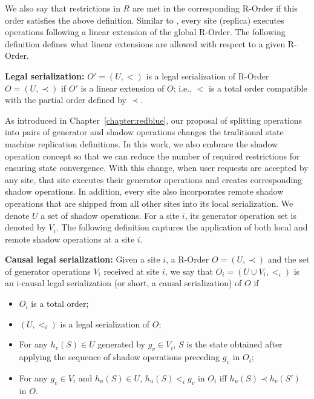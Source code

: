 We also say that restrictions in $R$ are met in the corresponding R-Order if this order
satisfies the above definition. Similar to \RBCN, every site (replica) executes operations following a linear
extension of the global R-Order. The following definition defines what linear extensions are allowed with respect to
a given R-Order.

\begin{mydef}
\textbf{Legal serialization: } $O' = (U, <)$ is a legal serialization of R-Order $O = (U, \prec)$
if $O'$ is a linear extension of $O$; i.e., $<$ is a total order compatible with the partial order defined by $\prec$.
\label{def:legalserial}
\end{mydef}

As introduced in Chapter~\ref{chapter:redblue}, our proposal of splitting operations into pairs of generator and shadow
operations changes the traditional state machine replication definitions. In this work, we also embrace
the shadow operation concept so that we can reduce the number of required restrictions for ensuring
state convergence. With this change,
when user requests are accepted by any site, that site executes their generator operations and 
creates corresponding shadow operations. In addition, every site also 
incorporates remote shadow operations that are shipped from all other sites into its local serialization. 
We denote $U$ a set of shadow operations. For a site $i$,
its generator operation set is denoted by $V_{i}$. The following definition captures the application
of both local and remote shadow operations at a site $i$.


\begin{mydef}
\textbf{Causal legal serialization: } Given a site $i$, a R-Order $O=(U, \prec)$ and the set of generator operations $V_i$ received at site $i$, we say that $O_i = (U\cup V_{i}, <_i)$ is an i-causal legal serialization (or short, a
causal serialization) of $O$ if
\begin{itemize}
\item $O_i$ is a total order;
\item $(U,<_i)$ is a legal serialization of $O$;
\item For any $h_v(S)\in U$ generated by $g_v\in V_i$, $S$ is the
  state obtained after applying the sequence of
  shadow operations preceding $g_v$ in $O_i$;
\item For any $g_v\in V_i$ and $h_u(S) \in U$, $h_u(S)<_{i}g_v$ in $O_i$
  iff $h_u(S) \prec h_v(S')$ in $O$.
\end{itemize}
\label{def:causalserial}
\end{mydef}

